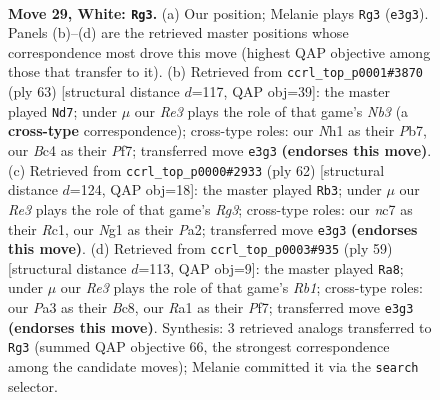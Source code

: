 \documentclass[11pt]{article}
\begin{document}
\clearpage

\begin{figure}[p]\centering
\begin{subfigure}{0.46\textwidth}\centering
\resizebox{\linewidth}{!}{%
\newchessgame
\chessboard[
  setfen={4rb2/2nkn1pr/6b1/7p/p1B1pP1P/P3R3/1P4P1/R2K2NN w - - 18 29},
  showmover=false,
  pgfstyle=straightmove, color=movearrow, markmove={e3-g3}
]}
\caption{}
\end{subfigure}\hfill
\begin{subfigure}{0.46\textwidth}\centering
\resizebox{\linewidth}{!}{%
\newchessgame
\chessboard[
  setfen={r5k1/1p3p2/nn2p1bB/p5P1/P1prP3/5P2/1PB3K1/2R2N1R b - - 1 32},
  showmover=false,
  pgfstyle=straightmove, color=movearrow, markmove={b6-d7}
]}
\caption{}
\end{subfigure}
\\[4pt]
\begin{subfigure}{0.46\textwidth}\centering
\resizebox{\linewidth}{!}{%
\newchessgame
\chessboard[
  setfen={1r3rkn/p5b1/3p2p1/1Pp1p3/4P2P/6RK/PP1B3N/2R5 w - - 3 32},
  showmover=false,
  pgfstyle=straightmove, color=movearrow, markmove={g3-b3}
]}
\caption{}
\end{subfigure}\hfill
\begin{subfigure}{0.46\textwidth}\centering
\resizebox{\linewidth}{!}{%
\newchessgame
\chessboard[
  setfen={1rb1k3/5pr1/2P1pp2/pP1p3p/n4P2/5NP1/3KB2P/3R3R b - - 2 30},
  showmover=false,
  pgfstyle=straightmove, color=movearrow, markmove={b8-a8}
]}
\caption{}
\end{subfigure}
\caption{\textbf{Move 29, White: \texttt{Rg3}.} (a) Our position; Melanie plays \texttt{Rg3} (\texttt{e3g3}). Panels (b)--(d) are the retrieved master positions whose correspondence most drove this move (highest QAP objective among those that transfer to it). (b) Retrieved from \texttt{ccrl\_top\_p0001\#3870} (ply 63) [structural distance $d$=117, QAP obj=39]: the master played \texttt{Nd7}; under $\mu$ our \emph{Re3} plays the role of that game's \emph{Nb3} (a \textbf{cross-type} correspondence); cross-type roles: our \emph{N}h1 as their \emph{P}b7, our \emph{B}c4 as their \emph{P}f7; transferred move \texttt{e3g3} \textbf{(endorses this move)}. (c) Retrieved from \texttt{ccrl\_top\_p0000\#2933} (ply 62) [structural distance $d$=124, QAP obj=18]: the master played \texttt{Rb3}; under $\mu$ our \emph{Re3} plays the role of that game's \emph{Rg3}; cross-type roles: our \emph{n}c7 as their \emph{R}c1, our \emph{N}g1 as their \emph{P}a2; transferred move \texttt{e3g3} \textbf{(endorses this move)}. (d) Retrieved from \texttt{ccrl\_top\_p0003\#935} (ply 59) [structural distance $d$=113, QAP obj=9]: the master played \texttt{Ra8}; under $\mu$ our \emph{Re3} plays the role of that game's \emph{Rb1}; cross-type roles: our \emph{P}a3 as their \emph{B}c8, our \emph{R}a1 as their \emph{P}f7; transferred move \texttt{e3g3} \textbf{(endorses this move)}. Synthesis: 3 retrieved analogs transferred to \texttt{Rg3} (summed QAP objective 66, the strongest correspondence among the candidate moves); Melanie committed it via the \texttt{search} selector.}
\label{fig:thought-m56}
\end{figure}
\end{document}
